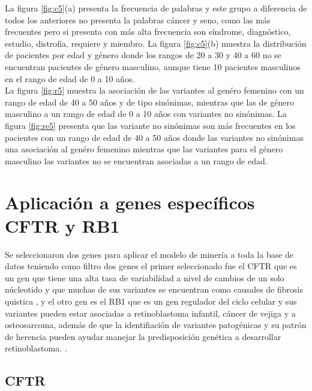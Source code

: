 La figura \ref{fig:c5}(a) presenta la frecuencia de palabras y este grupo a diferencia de todos los anteriores no presenta la palabras cáncer y seno, como las más frecuentes pero si presenta con más alta frecuencia son síndrome, diagnóstico, estudio, distrofia, requiere y miembro. La figura \ref{fig:c5}(b) muestra la distribución de pacientes por edad y género donde los rangos de 20 a 30 y 40 a 60 no se encuentran pacientes de género masculino, aunque tiene 10 pacientes masculinos en el rango de edad de 0 a 10 años. \\


La figura \ref{fig:r5} muestra la asociación de las variantes al genéro femenino con un rango de edad de 40 a 50 años y de tipo sinónimas, mientras que las de género masculino  a un rango de edad de 0 a 10 años con variantes no sinónimas. La figura \ref{fig:re5} presenta que las variante no sinónimas son más frecuentes en los pacientes con un rango de edad de 40 a 50 años donde las variantes no sinónimas una asociación al genéro femenino mientras que las variantes para el género masculino las variantes no se encuentran asociadas a un rango de edad. 


\section{Aplicación a genes específicos CFTR y RB1}

Se seleccionaron dos genes para aplicar el modelo de minería a toda la base de datos teniendo como filtro dos genes el primer  seleccionado fue el  CFTR que es un gen que tiene una alta tasa de variabilidad a nivel de cambios de un solo núcleotido y que muchas de sus variantes se encuentran como causales de fibrosis quistica \cite{Rowntree2003, Terlizzi2017b, Farrell2016}, y el otro gen es el RB1 que es un gen regulador del ciclo celular y sus variantes pueden estar asociadas a retinoblastoma  infantil, cáncer de vejiga y a osteosarcoma, además de que la identifiación de variantes patogénicas y su patrón de herencia pueden ayudar manejar la predisposición genética a desarrollar retinoblastoma. \cite{Liu2016, Yousef2018}. \\

\subsection*{CFTR}

